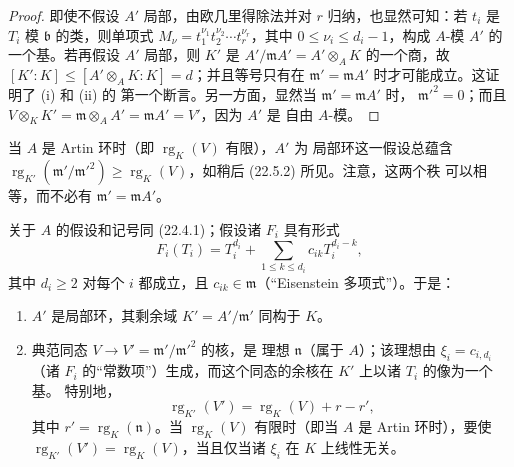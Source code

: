\begin{proof}
即使不假设 $A'$ 局部，由欧几里得除法并对 $r$ 归纳，也显然可知：若
$t_i$ 是 $T_i$ 模 $\mathfrak b$ 的类，则单项式
$M_\nu=t_1^{\nu_1}t_2^{\nu_2}\cdots t_r^{\nu_r}$，其中
$0\leqslant\nu_i\leqslant d_i-1$，构成 $A$-模 $A'$ 的一个基。若再假设
$A'$ 局部，则 $K'$ 是
$A'/\mathfrak mA'=A'\otimes_AK$ 的一个商，故
$[K':K]\leqslant[A'\otimes_AK:K]=d$；并且等号只有在
$\mathfrak m'=\mathfrak mA'$ 时才可能成立。这证明了 (i) 和 (ii) 的
第一个断言。另一方面，显然当 $\mathfrak m'=\mathfrak mA'$ 时，
$\mathfrak m'^2=0$；而且
$V\otimes_KK'=\mathfrak m\otimes_AA'=\mathfrak mA'=V'$，因为 $A'$ 是
自由 $A$-模。
\end{proof}

\begin{remark}[22.4.2]
\label{0.22.4.2-fr}
当 $A$ 是 Artin 环时（即 $\operatorname{rg}_K(V)$ 有限），$A'$ 为
局部环这一假设总蕴含
$\operatorname{rg}_{K'}(\mathfrak m'/\mathfrak m'^2)
\geqslant\operatorname{rg}_K(V)$，如稍后 (22.5.2) 所见。注意，这两个秩
可以相等，而不必有 $\mathfrak m'=\mathfrak mA'$。
\end{remark}

\begin{proposition}[22.4.3]
\label{0.22.4.3-fr}
关于 $A$ 的假设和记号同 (22.4.1)；假设诸 $F_i$ 具有形式
\begin{equation}
\label{0.22.4.3.1-fr}
  F_i(T_i)=T_i^{d_i}+\sum_{1\leqslant k\leqslant d_i}
  c_{ik}T_i^{d_i-k},
  \tag{22.4.3.1}
\end{equation}
其中 $d_i\geqslant2$ 对每个 $i$ 都成立，且
$c_{ik}\in\mathfrak m$（“Eisenstein 多项式”）。于是：
\begin{enumerate}
  \item[(i)] $A'$ 是局部环，其剩余域
  $K'=A'/\mathfrak m'$ 同构于 $K$。


  \item[(ii)] 典范同态 $V\to V'=\mathfrak m'/\mathfrak m'^2$ 的核，是
  理想 $\mathfrak n$（属于 $A$）；该理想由
  $\xi_i=c_{i,d_i}$（诸 $F_i$ 的“常数项”）生成，而这个同态的余核在
  $K'$ 上以诸 $T_i$ 的像为一个基。
  特别地，
  \begin{equation}
  \label{0.22.4.3.2-fr}
    \operatorname{rg}_{K'}(V')=\operatorname{rg}_K(V)+r-r',
    \tag{22.4.3.2}
  \end{equation}
  其中 $r'=\operatorname{rg}_K(\mathfrak n)$。当
  $\operatorname{rg}_K(V)$ 有限时（即当 $A$ 是 Artin 环时），要使
  $\operatorname{rg}_{K'}(V')=\operatorname{rg}_K(V)$，当且仅当诸
  $\xi_i$ 在 $K$ 上线性无关。
\end{enumerate}
\end{proposition}

